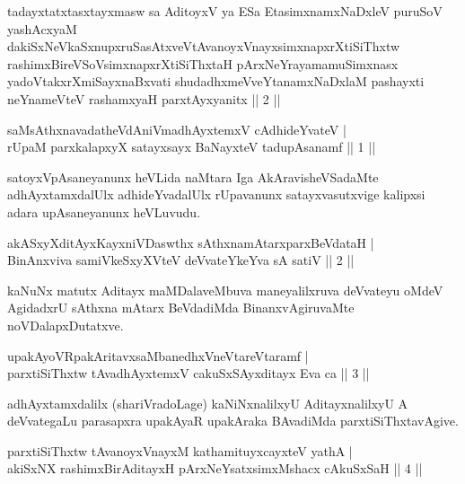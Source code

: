 \begin{kandikeshl}
tadayxtatxtasxtayxmasw sa AditoyxV ya ESa EtasimxnamxNaDxleV puruSoV yashAcxyaM dakiSxNeV\s kaSxnupxruSasAtxveVtAvanoyxVnayxsimxnapxrXtiSiThxtw rashimx\-\break BireVSoV\s simxnapxrXtiSiThxtaH pArxNeYrayamamuSimxnasx yadoVtakxrXmiSayxnaBxvati shudadhxmeVveYtanamxNaDxlaM pashayxti neYnameVteV rashamxyaH parxtAyxyanitx || 2 ||
\end{kandikeshl}

\begin{shl}
saMsAthxnavadatheVdAniVmadhAyxtemxV cAdhideYvateV | \\
rUpaM parxkalapxyX satayxsayx BaNayxteV  tadupAsanamf \hfill ||  1 || 
\end{shl}

\begin{artha}
satoyxVpAsaneyanunx heVLida naMtara Iga AkAravisheVSadaMte adhAyxtamxdalUlx adhideYvadalUlx rUpavanunx satayxvasutxvige kalipxsi adara upAsaneyanunx heVLuvudu.
\end{artha}

\begin{shl}
akASxyXditAyxKayxniVDaswthx sAthxnamAtarxparxBeVdataH | \\
BinAnxviva samiVkeSxyXVteV deVvateYkeYva sA satiV \hfill ||  2 || 
\end{shl}

\begin{artha}
kaNuNx matutx Aditayx maMDalaveMbuva maneyalilxruva deVvateyu oMdeV AgidadxrU sAthxna mAtarx BeVdadiMda BinanxvAgiruvaMte noVDalapxDutatxve.
\end{artha}

\begin{shl}
upakAyoVRpakAritavxsaMbanedhxVneVtareVtaramf | \\
parxtiSiThxtw tAvadhAyxtemxV cakuSxSAyxditayx Eva ca \hfill ||  3 || 
\end{shl}

\begin{artha}
adhAyxtamxdalilx (shariVradoLage) kaNiNxnalilxyU AditayxnalilxyU A deVvategaLu parasapxra upakAyaR upakAraka BAvadiMda parxtiSiThxtavAgive.
\end{artha}

\begin{shl}
parxtiSiThxtw tAvanoyxVnayxM kathamituyxcayxteV yathA  | \\
akiSxNX rashimxBirAditayxH pArxNeYsatxsimxMshacx cAkuSxSaH \hfill ||  4 || 
\end{shl}

